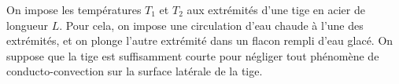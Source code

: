 On impose les températures $T_1$ et $T_2$ aux extrémités d'une tige en acier de longueur $L$. Pour cela, on impose une circulation d'eau chaude à l'une des extrémités, et on plonge l'autre extrémité dans un flacon rempli d'eau glacé. On suppose que la tige est suffisamment courte pour négliger tout phénomène de conducto-convection sur la surface latérale de la tige.
\begin{quest}
\end{quest}

